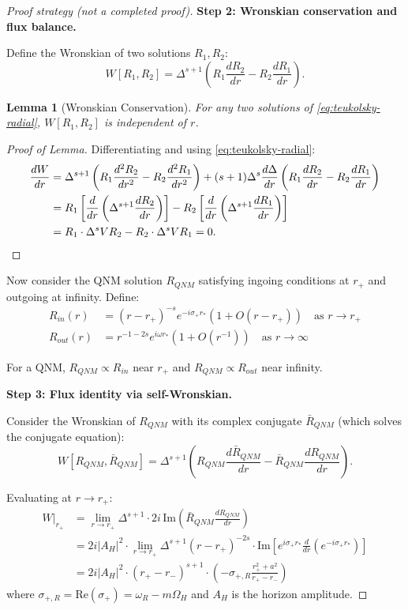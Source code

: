 \documentclass[12pt,a4paper]{article}
\newtheorem{lemma}[theorem]{Lemma}
\begin{document}
\begin{proof}[Proof strategy (not a completed proof)]
\textbf{Step 2: Wronskian conservation and flux balance.}

Define the Wronskian of two solutions $R_1, R_2$:
\begin{equation}
W[R_1, R_2] = \Delta^{s+1}\left(R_1 \frac{dR_2}{dr} - R_2 \frac{dR_1}{dr}\right).
\end{equation}

\begin{lemma}[Wronskian Conservation]
For any two solutions of \eqref{eq:teukolsky-radial}, $W[R_1, R_2]$ is independent of $r$.
\end{lemma}

\begin{proof}[Proof of Lemma]
Differentiating and using \eqref{eq:teukolsky-radial}:
\begin{align}
\frac{dW}{dr} &= \Delta^{s+1}\left(R_1 \frac{d^2R_2}{dr^2} - R_2 \frac{d^2R_1}{dr^2}\right) + (s+1)\Delta^s \frac{d\Delta}{dr}\left(R_1 \frac{dR_2}{dr} - R_2 \frac{dR_1}{dr}\right) \\
&= R_1\left[\frac{d}{dr}\left(\Delta^{s+1}\frac{dR_2}{dr}\right)\right] - R_2\left[\frac{d}{dr}\left(\Delta^{s+1}\frac{dR_1}{dr}\right)\right] \\
&= R_1 \cdot \Delta^s V R_2 - R_2 \cdot \Delta^s V R_1 = 0. \qedhere
\end{align}
\end{proof}

Now consider the QNM solution $R_{QNM}$ satisfying ingoing conditions at $r_+$ and outgoing at infinity. Define:
\begin{align}
R_{in}(r) &= (r-r_+)^{-s}e^{-i\sigma_+ r_*}(1 + O(r-r_+)) \quad \text{as } r \to r_+ \\
R_{out}(r) &= r^{-1-2s}e^{i\omega r_*}(1 + O(r^{-1})) \quad \text{as } r \to \infty
\end{align}

For a QNM, $R_{QNM} \propto R_{in}$ near $r_+$ and $R_{QNM} \propto R_{out}$ near infinity.

\textbf{Step 3: Flux identity via self-Wronskian.}

Consider the Wronskian of $R_{QNM}$ with its complex conjugate $\bar{R}_{QNM}$ (which solves the conjugate equation):
\begin{equation}
W[R_{QNM}, \bar{R}_{QNM}] = \Delta^{s+1}\left(R_{QNM}\frac{d\bar{R}_{QNM}}{dr} - \bar{R}_{QNM}\frac{dR_{QNM}}{dr}\right).
\end{equation}

Evaluating at $r \to r_+$:
\begin{align}
W|_{r_+} &= \lim_{r \to r_+} \Delta^{s+1} \cdot 2i\,\text{Im}\left(\bar{R}_{QNM}\frac{dR_{QNM}}{dr}\right) \\
&= 2i|A_H|^2 \cdot \lim_{r\to r_+} \Delta^{s+1}(r-r_+)^{-2s}\cdot \text{Im}\left[e^{i\sigma_+ r_*}\frac{d}{dr}\left(e^{-i\sigma_+ r_*}\right)\right] \\
&= 2i|A_H|^2 \cdot (r_+ - r_-)^{s+1} \cdot \left(-\sigma_{+,R}\frac{r_+^2+a^2}{r_+-r_-}\right)
\end{align}
where $\sigma_{+,R} = \text{Re}(\sigma_+) = \omega_R - m\Omega_H$ and $A_H$ is the horizon amplitude.


\end{proof}
\end{document}
